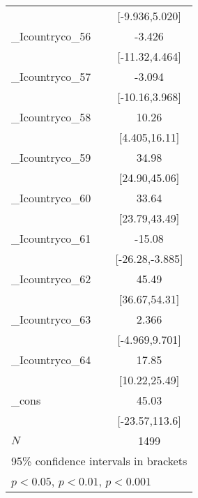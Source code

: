{\begin{tabular}{l*{1}{c}}
            &        [-9.936,5.020]         \\
[1em]
\_Icountryco\_56&                -3.426         \\
            &        [-11.32,4.464]         \\
[1em]
\_Icountryco\_57&                -3.094         \\
            &        [-10.16,3.968]         \\
[1em]
\_Icountryco\_58&                 10.26\sym{***}\\
            &         [4.405,16.11]         \\
[1em]
\_Icountryco\_59&                 34.98\sym{***}\\
            &         [24.90,45.06]         \\
[1em]
\_Icountryco\_60&                 33.64\sym{***}\\
            &         [23.79,43.49]         \\
[1em]
\_Icountryco\_61&                -15.08\sym{**} \\
            &       [-26.28,-3.885]         \\
[1em]
\_Icountryco\_62&                 45.49\sym{***}\\
            &         [36.67,54.31]         \\
[1em]
\_Icountryco\_63&                 2.366         \\
            &        [-4.969,9.701]         \\
[1em]
\_Icountryco\_64&                 17.85\sym{***}\\
            &         [10.22,25.49]         \\
[1em]
\_cons      &                 45.03         \\
            &        [-23.57,113.6]         \\
\hline
\(N\)       &                  1499         \\
\hline\hline
\multicolumn{2}{l}{\footnotesize 95\% confidence intervals in brackets}\\
\multicolumn{2}{l}{\footnotesize \sym{*} \(p<0.05\), \sym{**} \(p<0.01\), \sym{***} \(p<0.001\)}\\
\end{tabular}
}
